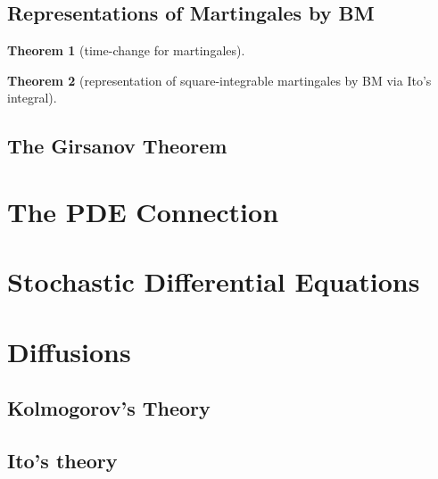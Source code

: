 \documentclass{article}
\newtheorem{Thm}{Theorem}[section]
\theoremstyle{definition}
\newcommand{\<}{\left\langle}
\renewcommand{\>}{\right\rangle}
\begin{document}
\subsection{Representations of Martingales by BM}


\begin{Thm}[time-change for martingales]
    
\end{Thm}


\begin{Thm}[representation of square-integrable martingales by BM via Ito's integral]
    
\end{Thm}

\subsection{The Girsanov Theorem}


\section{The PDE Connection}




\section{Stochastic Differential Equations}




\section{Diffusions}

\subsection{Kolmogorov's Theory}


\subsection{Ito's theory}
\end{document}
